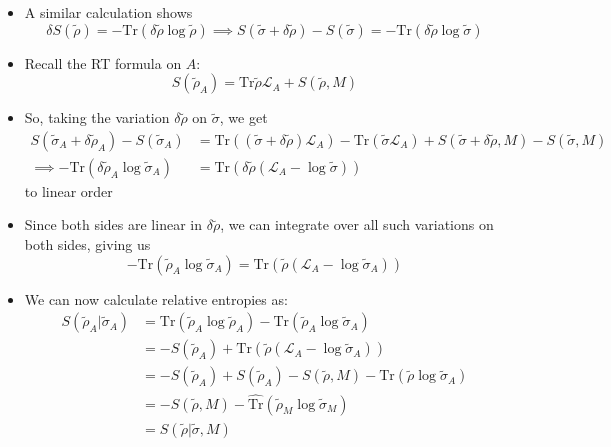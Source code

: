 \documentclass[12pt,a4paper]{article}
\numberwithin{equation}{section}
\theoremstyle{definition}
\theoremstyle{theorem}
\theoremstyle{example}
\begin{document}
\begin{itemize}
		\item A similar calculation shows
		\begin{equation}
			\delta S(\tilde{\rho})=-\text{Tr}(\delta\tilde{\rho}\log\tilde{\rho})\implies S(\tilde{\sigma}+\delta\tilde{\rho})
			-S(\tilde{\sigma})=-\text{Tr}\left(\delta\tilde{\rho}\log\tilde{\sigma}\right)
		\end{equation}
		\item Recall the RT formula on $A$:
		\begin{equation}
			S(\tilde{\rho}_{A})=\text{Tr}\tilde{\rho}\mathcal{L}_{A}+S(\tilde{\rho},M)
		\end{equation}
		\item So, taking the variation $\delta{\tilde{\rho}}$ on $\tilde{\sigma}$, we get
		\begin{equation}
			\begin{aligned}
				S(\tilde{\sigma}_{A}+\delta\tilde{\rho}_{A})-S(\tilde{\sigma}_{A})&=\text{Tr}\left((\tilde{\sigma}+\delta\tilde{\rho})\mathcal{L}_{A}\right)-\text{Tr}\left(\tilde{\sigma}\mathcal{L}_{A}\right)+S(\tilde{\sigma}+\delta\tilde{\rho},M)-S(\tilde{\sigma},M)\\\implies -\text{Tr}\left(\delta\tilde{\rho}_{A}\log\tilde{\sigma}_{A}\right)&=\text{Tr}\left(\delta\tilde{\rho}\left(\mathcal{L}_{A}-\log\tilde{\sigma}\right)\right)
			\end{aligned}
		\end{equation}
		to linear order
		\item Since both sides are linear in $\delta\tilde{\rho}$, we can integrate over all such variations on both sides, giving us
		\begin{equation}
			-\text{Tr}\left(\tilde{\rho}_{A}\log\tilde{\sigma}_{A}\right)=\text{Tr}\left(\tilde{\rho}\left(\mathcal{L}_{A}-\log\tilde{\sigma}_{A}\right)\right)
		\end{equation}
		\item We can now calculate relative entropies as:
		\begin{equation}
			\begin{aligned}
				S(\tilde{\rho}_{A}|\tilde{\sigma}_{A})&=\text{Tr}\left(\tilde{\rho}_{A}\log\tilde{\rho}_{A}\right)-\text{Tr}\left(\tilde{\rho}_{A}\log\tilde{\sigma}_{A}\right)\\&=-S(\tilde{\rho}_{A})+\text{Tr}\left(\tilde{\rho}(\mathcal{L}_{A}-\log\tilde{\sigma}_{A})\right)\\&=-S(\tilde{\rho}_{A})+S(\tilde{\rho}_{A})-S(\tilde{\rho},M)-\text{Tr}\left(\tilde{\rho}\log\tilde{\sigma}_{A}\right)\\&=-S(\tilde{\rho},M)-\hat{\text{Tr}}\left(\tilde{\rho}_{M}\log\tilde{\sigma}_{M}\right)\\&=S(\tilde{\rho}|\tilde{\sigma},M)

\end{aligned}
\end{equation}
\end{itemize}
\end{document}
